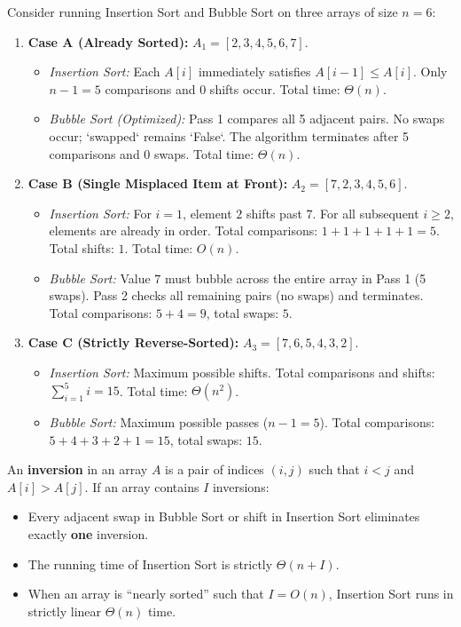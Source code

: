 \documentclass[11pt,a4paper]{article}
\begin{document}
\begin{examplebox}
Consider running Insertion Sort and Bubble Sort on three arrays of size $n = 6$:
\begin{enumerate}[itemsep=2pt]
    \item \textbf{Case A (Already Sorted):} $A_1 = [2, 3, 4, 5, 6, 7]$.
    \begin{itemize}[itemsep=1pt]
        \item \emph{Insertion Sort:} Each $A[i]$ immediately satisfies $A[i-1] \le A[i]$. Only $n - 1 = 5$ comparisons and $0$ shifts occur. Total time: $\Theta(n)$.
        \item \emph{Bubble Sort (Optimized):} Pass 1 compares all 5 adjacent pairs. No swaps occur; `swapped` remains `False`. The algorithm terminates after 5 comparisons and 0 swaps. Total time: $\Theta(n)$.
    \end{itemize}
    \item \textbf{Case B (Single Misplaced Item at Front):} $A_2 = [7, 2, 3, 4, 5, 6]$.
    \begin{itemize}[itemsep=1pt]
        \item \emph{Insertion Sort:} For $i=1$, element $2$ shifts past $7$. For all subsequent $i \ge 2$, elements are already in order. Total comparisons: $1 + 1 + 1 + 1 + 1 = 5$. Total shifts: $1$. Total time: $O(n)$.
        \item \emph{Bubble Sort:} Value $7$ must bubble across the entire array in Pass 1 (5 swaps). Pass 2 checks all remaining pairs (no swaps) and terminates. Total comparisons: $5 + 4 = 9$, total swaps: $5$.
    \end{itemize}
    \item \textbf{Case C (Strictly Reverse-Sorted):} $A_3 = [7, 6, 5, 4, 3, 2]$.
    \begin{itemize}[itemsep=1pt]
        \item \emph{Insertion Sort:} Maximum possible shifts. Total comparisons and shifts: $\sum_{i=1}^5 i = 15$. Total time: $\Theta(n^2)$.
        \item \emph{Bubble Sort:} Maximum possible passes ($n-1 = 5$). Total comparisons: $5 + 4 + 3 + 2 + 1 = 15$, total swaps: $15$.
    \end{itemize}
\end{enumerate}
\end{examplebox}

\begin{theorembox}
An \textbf{inversion} in an array $A$ is a pair of indices $(i, j)$ such that $i < j$ and $A[i] > A[j]$. If an array contains $I$ inversions:
\begin{itemize}[itemsep=1pt]
    \item Every adjacent swap in Bubble Sort or shift in Insertion Sort eliminates exactly \textbf{one} inversion.
    \item The running time of Insertion Sort is strictly $\Theta(n + I)$.
    \item When an array is ``nearly sorted'' such that $I = O(n)$, Insertion Sort runs in strictly linear $\Theta(n)$ time.
\end{itemize}
\end{theorembox}
\end{document}
